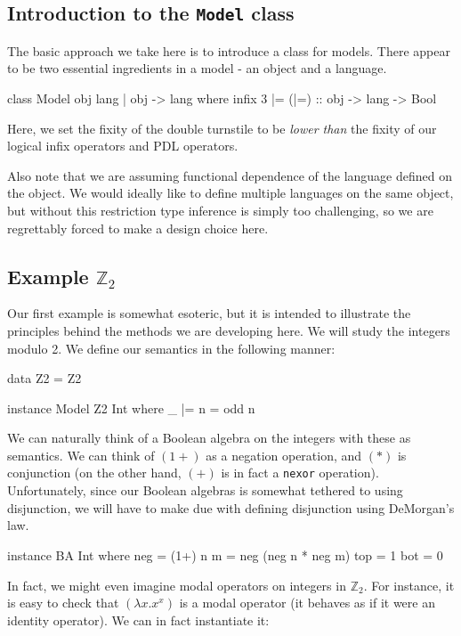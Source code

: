 \documentclass[11pt]{article}
\theoremstyle{definition}
\begin{document}
\subsection{Introduction to the \texttt{Model} class}
The basic approach we take here is to introduce a class for models.  There appear to be two essential ingredients in a model - an object and a language.

\begin{code}
class Model obj lang | obj -> lang where
  infix 3 |=
  (|=) :: obj -> lang -> Bool
\end{code}

Here, we set the fixity of the double turnstile to be \emph{lower than} the fixity of our logical infix operators and PDL operators.

Also note that we are assuming functional dependence of the language defined on the object.  We would ideally like to define multiple languages on the same object, but without this restriction type inference is simply too challenging, so we are regrettably forced to make a design choice here. 

\subsection{Example $\mathbb{Z}_2$}
Our first example is somewhat esoteric, but it is intended to illustrate the principles behind the methods we are developing here.  We will study the integers modulo 2.  We define our semantics in the following manner:

\begin{code}
data Z2 = Z2

instance Model Z2 Int where
  _ |= n = odd n
\end{code}

We can naturally think of a Boolean algebra on the integers with these as semantics.  We can think of $(1+)$ as a negation operation, and $(\ast)$ is conjunction (on the other hand, $(+)$ is in fact a \texttt{nexor} operation).  Unfortunately, since our Boolean algebras is somewhat tethered to using disjunction, we will have to make due with defining disjunction using DeMorgan's law.

\begin{code}
instance BA Int where
  neg = (1+)
  n \/ m = neg (neg n * neg m)
  top = 1
  bot = 0
\end{code}

In fact, we might even imagine modal operators on integers in $\mathbb{Z}_2$.  For instance, it is easy to check that $(\lambda x. x^x)$ is a modal operator (it behaves as if it were an identity operator).  We can in fact instantiate it:
\end{document}
